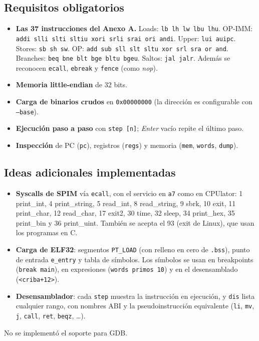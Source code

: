 \documentclass[11pt,a4paper]{article}
\newcommand{\cmd}[1]{\texttt{#1}}
\begin{document}
\subsection*{Requisitos obligatorios}
\begin{itemize}
  \item \textbf{Las 37 instrucciones del Anexo A.}
        Loads: \cmd{lb lh lw lbu lhu}.
        OP-IMM: \cmd{addi slli slti sltiu xori srli srai ori andi}.
        Upper: \cmd{lui auipc}.
        Stores: \cmd{sb sh sw}.
        OP: \cmd{add sub sll slt sltu xor srl sra or and}.
        Branches: \cmd{beq bne blt bge bltu bgeu}.
        Saltos: \cmd{jal jalr}.
        Además se reconocen \cmd{ecall}, \cmd{ebreak} y \cmd{fence} (como \emph{nop}).
  \item \textbf{Memoria little-endian} de 32 bits.
  \item \textbf{Carga de binarios crudos} en \cmd{0x00000000} (la dirección es configurable con \cmd{--base}).
  \item \textbf{Ejecución paso a paso} con \cmd{step [n]}; \emph{Enter} vacío repite el último paso.
  \item \textbf{Inspección} de PC (\cmd{pc}), registros (\cmd{regs}) y memoria (\cmd{mem}, \cmd{words}, \cmd{dump}).
\end{itemize}

\subsection*{Ideas adicionales implementadas}
\begin{itemize}
  \item \textbf{Syscalls de SPIM} vía \cmd{ecall}, con el servicio en \cmd{a7} como en CPUlator:
        1 print\_int, 4 print\_string, 5 read\_int, 8 read\_string, 9 sbrk, 10 exit, 11 print\_char,
        12 read\_char, 17 exit2, 30 time, 32 sleep, 34 print\_hex, 35 print\_bin y 36 print\_uint. También se acepta
        el 93 (exit de Linux), que usan los programas en C.
  \item \textbf{Carga de ELF32}: segmentos \cmd{PT\_LOAD} (con relleno en cero de \cmd{.bss}), punto de entrada
        \cmd{e\_entry} y tabla de símbolos. Los símbolos se usan en breakpoints (\cmd{break main}), en expresiones
        (\cmd{words primos 10}) y en el desensamblado (\cmd{<criba+12>}).
  \item \textbf{Desensamblador}: cada \cmd{step} muestra la instrucción en ejecución, y \cmd{dis} lista cualquier
        rango, con nombres ABI y la pseudoinstrucción equivalente (\cmd{li}, \cmd{mv}, \cmd{j}, \cmd{call},
        \cmd{ret}, \cmd{beqz}, \ldots).
\end{itemize}
No se implementó el soporte para GDB.
\end{document}
